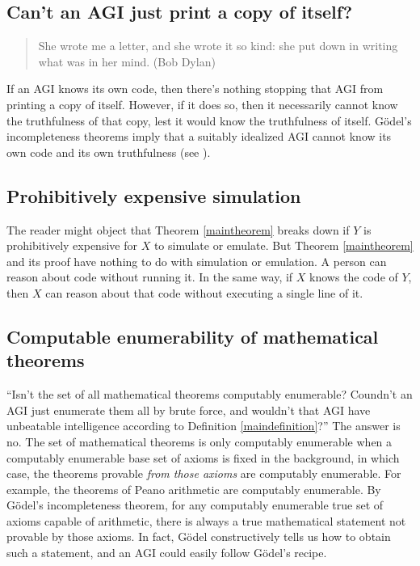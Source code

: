 \documentclass[runningheads]{llncs}
\begin{document}
\subsection{Can't an AGI just print a copy of itself?}

\begin{quote}
    She wrote me a letter, and she wrote it so kind:
    she put down in writing what was in her mind.
    (Bob Dylan)
\end{quote}

If an AGI knows its own code, then there's nothing stopping that
AGI from printing a copy of itself.
However, if it does so, then it necessarily cannot know the truthfulness of that
copy, lest it would know the truthfulness of itself.
G\"odel's incompleteness theorems imply that a suitably idealized AGI cannot know
its own code
and its own truthfulness (see \cite{alexander2014machine}).

\subsection{Prohibitively expensive simulation}

The reader might object that Theorem \ref{maintheorem} breaks down if $Y$ is prohibitively
expensive for $X$ to simulate or emulate. But Theorem \ref{maintheorem} and its
proof have nothing to do with simulation or emulation. A person can reason about code
without running it. In the same way, if $X$ knows the code
of $Y$, then $X$ can reason about that code without executing a single line
of it.

\subsection{Computable enumerability of mathematical theorems}

``Isn't the set of all mathematical theorems computably enumerable?
Coundn't an AGI just enumerate them all by brute force, and wouldn't that AGI have
unbeatable intelligence according to Definition \ref{maindefinition}?'' The answer is no.
The set of mathematical theorems is only computably enumerable when a computably
enumerable base set of axioms is fixed in the background, in which case,
the theorems provable \emph{from those axioms} are computably enumerable.
For example, the
theorems of Peano arithmetic are computably enumerable.
By G\"odel's incompleteness theorem, for any computably
enumerable true set of axioms capable of arithmetic, there is always a
true mathematical statement not provable by
those axioms. In fact, G\"odel constructively tells us how to obtain such a
statement, and an AGI could easily follow G\"odel's recipe.
\end{document}
